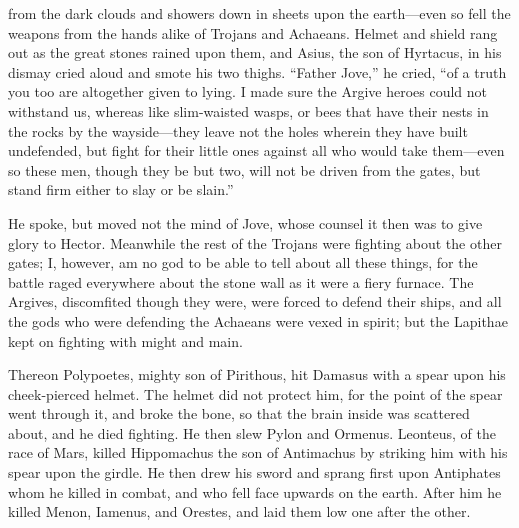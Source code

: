 from the dark clouds and showers down in sheets upon the earth—even
so fell the weapons from the hands alike of Trojans and Achaeans. Helmet
and shield rang out as the great stones rained upon them, and Asius, the
son of Hyrtacus, in his dismay cried aloud and smote his two thighs.
“Father Jove,” he cried, “of a truth you too are altogether given to
lying. I made sure the Argive heroes could not withstand us, whereas like
slim-waisted wasps, or bees that have their nests in the rocks by the
wayside—they leave not the holes wherein they have built undefended,
but fight for their little ones against all who would take them—even
so these men, though they be but two, will not be driven from the gates,
but stand firm either to slay or be slain.”

He spoke, but moved not the mind of Jove, whose counsel it then was to
give glory to Hector. Meanwhile the rest of the Trojans were fighting
about the other gates; I, however, am no god to be able to tell about all
these things, for the battle raged everywhere about the stone wall as it
were a fiery furnace. The Argives, discomfited though they were, were
forced to defend their ships, and all the gods who were defending the
Achaeans were vexed in spirit; but the Lapithae kept on fighting with
might and main.

Thereon Polypoetes, mighty son of Pirithous, hit Damasus with a spear upon
his cheek-pierced helmet. The helmet did not protect him, for the point of
the spear went through it, and broke the bone, so that the brain inside
was scattered about, and he died fighting. He then slew Pylon and Ormenus.
Leonteus, of the race of Mars, killed Hippomachus the son of Antimachus by
striking him with his spear upon the girdle. He then drew his sword and
sprang first upon Antiphates whom he killed in combat, and who fell face
upwards on the earth. After him he killed Menon, Iamenus, and Orestes, and
laid them low one after the other.

